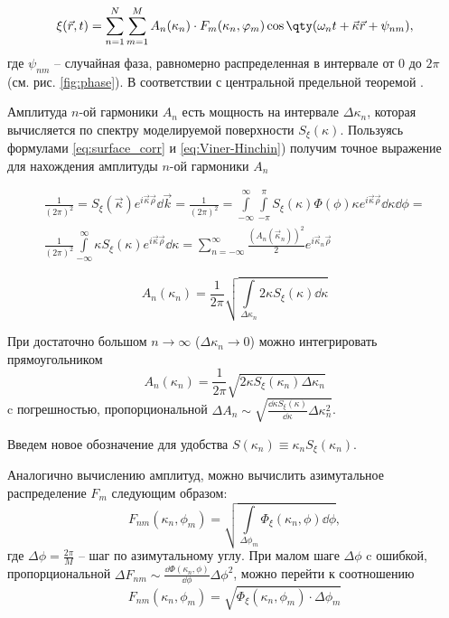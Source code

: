 \begin{equation}
    \label{eq:surface2d}
    \xi(\vec r,t) = \sum\limits_{n=1}^{N} \sum\limits_{m=1}^{M}
    A_n(\kappa_n) \cdot
    F_m(\kappa_n,\phi_m) \cos \qty(\omega_n t + \vec \kappa \vec r + \psi_{nm}),
\end{equation}
где $\psi_{nm}$ -- случайная фаза, равномерно распределенная в интервале от $0$
до $2 \pi$ (см. рис. \ref{fig:phase}). В соответствии с
центральной предельной теоремой \cite{cite:7}. 

Амплитуда $n$-ой гармоники $A_n$ есть
мощность на интервале $\Delta \kappa_n$, которая вычисляется по спектру моделируемой
поверхности $S_\xi(\kappa)$. Пользуясь формулами  \eqref{eq:surface_corr} и
\eqref{eq:Viner-Hinchin}) получим точное выражение для нахождения амплитуды
$n$-ой гармоники  $A_n$




\begin{gather}
    \frac{1}{(2 \pi)^2} = S_{\xi}(\vec \kappa) e^{i \vec \kappa \vec \rho} \dd \vec k = 
    \frac{1}{(2 \pi)^2} = 
        \int\limits_{-\infty}^{\infty}
        \int\limits_{- \pi}^{\pi} 
    S_\xi(\kappa) \Phi(\phi) \kappa e^{i \vec \kappa\vec \rho} \dd \kappa \dd \phi = \\
    \frac{1}{(2 \pi)^2} \int\limits_{-\infty}^{\infty} \kappa S_\xi
    (\kappa) e^{i \vec \kappa 
    \vec \rho} \dd \kappa = \sum\limits_{n=-\infty}^{\infty} \frac{(A_n(\vec
\kappa_n))^2}{2} e^{i \vec \kappa_n \vec \rho} 
\end{gather}

\begin{equation}
    \label{eq:Amplitude}
    A_n(\kappa_n) = \frac{1}{2 \pi} \sqrt{\int\limits_{\Delta \kappa_n} 2
        \kappa S_\xi(\kappa)
    \dd \kappa}
\end{equation}

При достаточно большом $n \to \infty$ ($\Delta \kappa_n \to 0$) можно интегрировать
прямоугольником
\begin{equation}
    A_n(\kappa_n) = \frac{1}{2 \pi} \sqrt{ 2 \kappa S_\xi(\kappa_n) \Delta
    \kappa_n}
\end{equation}
c погрешностью, пропорциональной $\Delta A_n \sim  \sqrt{\frac{\dd \kappa
    S_\xi(\kappa)}{\dd \kappa}
\Delta \kappa_n^2}$. 

Введем новое
обозначение для удобства $S(\kappa_n)\equiv \kappa_n S_\xi (\kappa_n)$.

Аналогично вычислению амплитуд, можно вычислить азимутальное распределение $F_m$  следующим образом:
\begin{equation}
    F_{nm}(\kappa_n,\phi_m) = \sqrt{\int\limits_{\Delta \phi_m}
    \Phi_{\xi}(\kappa_n,\phi) \dd \phi},
\end{equation}
где $\Delta \phi = \frac{2\pi}{M}$ -- шаг по азимутальному углу.
При малом шаге  $\Delta \phi$ c ошибкой, пропорциональной $\Delta F_{nm} \sim
\frac{\dd \Phi(\kappa_n,\phi)}{\dd \phi} \Delta \phi^2$, можно перейти к соотношению
\begin{equation}
    F_{nm} (\kappa_n,\phi_m) = \sqrt{\Phi_\xi(\kappa_n,\phi_m) \cdot \Delta \phi_m}
\end{equation}


